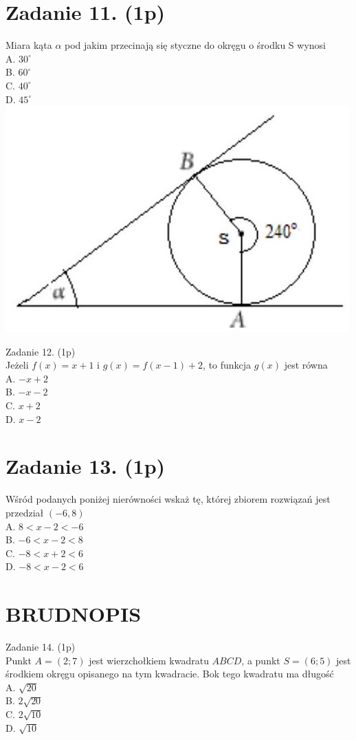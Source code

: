 \documentclass[10pt]{article}
\begin{document}
\section*{Zadanie 11. (1p)}
Miara kąta \(\alpha\) pod jakim przecinają się styczne do okręgu o środku S wynosi\\
A. \(30^{\circ}\)\\
B. \(60^{\circ}\)\\
C. \(40^{\circ}\)\\
D. \(45^{\circ}\)\\
\includegraphics[max width=\textwidth, center]{2024_11_21_b63ac6eb3d78a57ac924g-04}

Zadanie 12. (1p)\\
Jeżeli \(f(x)=x+1\) i \(g(x)=f(x-1)+2\), to funkcja \(g(x)\) jest równa\\
A. \(-x+2\)\\
B. \(-x-2\)\\
C. \(x+2\)\\
D. \(x-2\)

\section*{Zadanie 13. (1p)}
Wśród podanych poniżej nierówności wskaż tę, której zbiorem rozwiązań jest przedział \((-6,8)\)\\
A. \(8<x-2<-6\)\\
B. \(-6<x-2<8\)\\
C. \(-8<x+2<6\)\\
D. \(-8<x-2<6\)

\section*{BRUDNOPIS}
Zadanie 14. (1p)\\
Punkt \(A=(2 ; 7)\) jest wierzchołkiem kwadratu \(A B C D\), a punkt \(S=(6 ; 5)\) jest środkiem okręgu opisanego na tym kwadracie. Bok tego kwadratu ma długość\\
A. \(\sqrt{20}\)\\
B. \(2 \sqrt{20}\)\\
C. \(2 \sqrt{10}\)\\
D. \(\sqrt{10}\)
\end{document}
